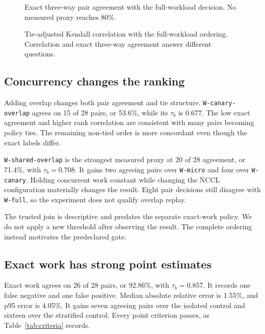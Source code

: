 \documentclass[10pt,twocolumn]{article}
\newcommand{\wname}[1]{\texttt{W-#1}}
\begin{document}
\begin{figure}[t]
  \centering
  \resizebox{0.98\columnwidth}{!}{}
  \caption{Exact three-way pair agreement with the full-workload decision. No
  measured proxy reaches 80\%.}
  \label{fig:agreement}
\end{figure}

\begin{figure}[t]
  \centering
  \resizebox{0.98\columnwidth}{!}{}
  \caption{Tie-adjusted Kendall correlation with the full-workload ordering.
  Correlation and exact three-way agreement answer different questions.}
  \label{fig:kendall}
\end{figure}

\subsection{Concurrency changes the ranking}

Adding overlap changes both pair agreement and tie structure.
\wname{canary-overlap} agrees on 15 of 28 pairs, or 53.6\%, while its
$\tau_b$ is 0.677. The low exact agreement and higher rank correlation are
consistent with many pairs becoming policy ties. The remaining non-tied order
is more concordant even though the exact labels differ.

\wname{shared-overlap} is the strongest measured proxy at 20 of 28 agreement,
or 71.4\%, with $\tau_b=0.708$. It gains two agreeing pairs over
\wname{micro} and four over \wname{canary}. Holding concurrent work constant
while changing the NCCL configuration materially changes the result. Eight pair
decisions still disagree with \wname{full}, so the experiment does not qualify
overlap replay.

The trusted join is descriptive and predates the separate exact-work policy.
We do not apply a new threshold after observing the result. The complete
ordering instead motivates the predeclared gate.

\subsection{Exact work has strong point estimates}

Exact work agrees on 26 of 28 pairs, or 92.86\%, with $\tau_b=0.857$. It
records one false negative and one false positive. Median absolute relative
error is 1.55\%, and p95 error is 4.05\%. It gains seven agreeing pairs over
the isolated control and sixteen over the stratified control. Every point
criterion passes, as Table~\ref{tab:criteria} records.
\end{document}
